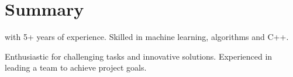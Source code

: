 \section{Summary}
\summaryPosition\space with 5+ years of experience. Skilled in machine learning, algorithms and C++.

Enthusiastic for challenging tasks and innovative solutions. Experienced in leading a team to achieve project goals.
